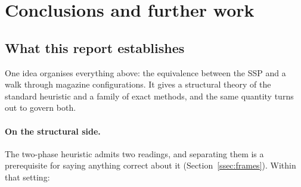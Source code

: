 \section{Conclusions and further work}\label{sec:concl}

\subsection{What this report establishes}\label{ssec:concl-summary}

One idea organises everything above: the equivalence between the SSP and a walk
through magazine configurations. It gives a structural theory of the standard
heuristic and a family of exact methods, and the same quantity turns out to govern
both.

\paragraph{On the structural side.}
The two-phase heuristic admits two readings, and separating them is a prerequisite for
saying anything correct about it (Section~\ref{ssec:frames}). Within that setting:

